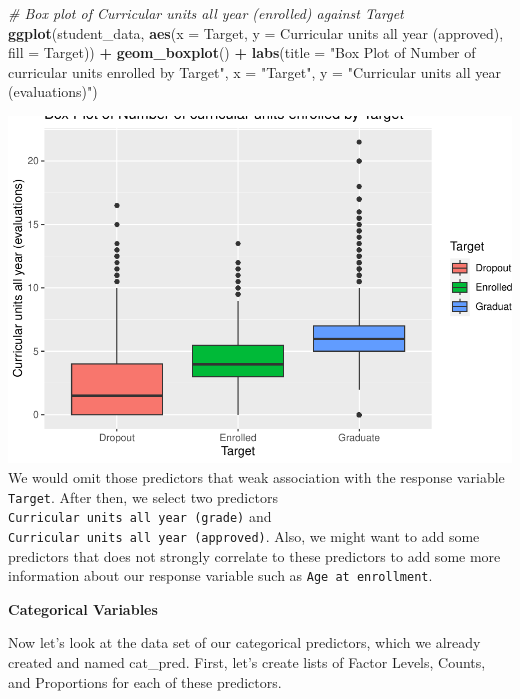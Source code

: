 \documentclass[
]{article}
\newenvironment{Shaded}{\begin{snugshade}}{\end{snugshade}}
\newcommand{\AttributeTok}[1]{\textcolor[rgb]{0.13,0.29,0.53}{#1}}
\newcommand{\CommentTok}[1]{\textcolor[rgb]{0.56,0.35,0.01}{\textit{#1}}}
\newcommand{\FunctionTok}[1]{\textcolor[rgb]{0.13,0.29,0.53}{\textbf{#1}}}
\newcommand{\NormalTok}[1]{#1}
\newcommand{\SpecialCharTok}[1]{\textcolor[rgb]{0.81,0.36,0.00}{\textbf{#1}}}
\newcommand{\StringTok}[1]{\textcolor[rgb]{0.31,0.60,0.02}{#1}}
\begin{document}
\begin{Shaded}
\begin{Highlighting}[]
\CommentTok{\# Box plot of Curricular units all year (enrolled) against \textquotesingle{}Target\textquotesingle{}}
\FunctionTok{ggplot}\NormalTok{(student\_data, }\FunctionTok{aes}\NormalTok{(}\AttributeTok{x =}\NormalTok{ Target, }\AttributeTok{y =} \StringTok{\textasciigrave{}}\AttributeTok{Curricular units all year (approved)}\StringTok{\textasciigrave{}}\NormalTok{, }\AttributeTok{fill =}\NormalTok{ Target)) }\SpecialCharTok{+} 
  \FunctionTok{geom\_boxplot}\NormalTok{() }\SpecialCharTok{+}
  \FunctionTok{labs}\NormalTok{(}\AttributeTok{title =} \StringTok{"Box Plot of Number of curricular units enrolled by Target"}\NormalTok{, }\AttributeTok{x =} \StringTok{"Target"}\NormalTok{, }\AttributeTok{y =} \StringTok{"Curricular units all year (evaluations)"}\NormalTok{)}
\end{Highlighting}
\end{Shaded}

\includegraphics{exploratory_data_analysis_files/figure-latex/unnamed-chunk-22-1.pdf}
We would omit those predictors that weak association with the response
variable \texttt{Target}. After then, we select two predictors
\texttt{Curricular\ units\ all\ year\ (grade)} and
\texttt{Curricular\ units\ all\ year\ (approved)}. Also, we might want
to add some predictors that does not strongly correlate to these
predictors to add some more information about our response variable such
as \texttt{Age\ at\ enrollment}.

\textbf{Categorical Variables}

Now let's look at the data set of our categorical predictors, which we
already created and named cat\_pred. First, let's create lists of Factor
Levels, Counts, and Proportions for each of these predictors.
\end{document}

